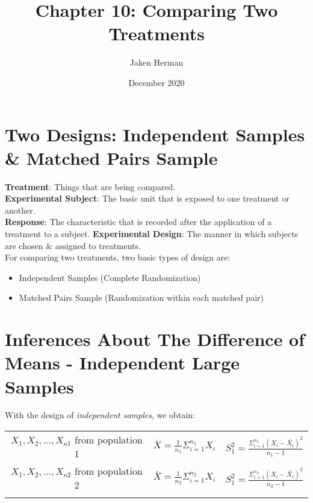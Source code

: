 \documentclass{article}
\title{Chapter 10: Comparing Two Treatments}
\author{Jaken Herman }
\date{December 2020}
\begin{document}
\maketitle

\section{Two Designs: Independent Samples \& Matched Pairs Sample}
\textbf{Treatment}: Things that are being compared. \\
\textbf{Experimental Subject}: The basic unit that is exposed to one treatment or another. \\
\textbf{Response}: The characteristic that is recorded after the application of a treatment to a subject.
\textbf{Experimental Design}: The manner in which subjects are chosen \& assigned to treatments. \\

For comparing two treatments, two basic types of design are:
\begin{itemize}
    \item{Independent Samples (Complete Randomization)}
    \item{Matched Pairs Sample (Randomization within each matched pair)}
\end{itemize}


\section{Inferences About The Difference of Means - Independent Large Samples}
With the design of \textit{independent samples}, we obtain:

\begin{mdframed}
\begin{center}
\begin{tabular}{ c c c }
 \(X_1, X_2, ..., X_{n1}\) from population 1 & \(\bar{X} = \frac{1}{n_1}\Sigma_{i=1}^{n_1}X_i\) & \(S_1^2=\frac{\Sigma_{i=1}^{n_1}(X_i - \bar{X_i})^2}{n_1 - 1}\) \\ 
 \(X_1, X_2, ..., X_{n2}\) from population 2 & \(\bar{X} = \frac{1}{n_2}\Sigma_{i=1}^{n_2}X_i\) & \(S_1^2=\frac{\Sigma_{i=1}^{n_2}(X_i - \bar{X_i})^2}{n_2 - 1}\) \\ 
 \(\) & \(\) & \(\)    
\end{tabular}
\end{center}
\end{mdframed}
\end{document}
